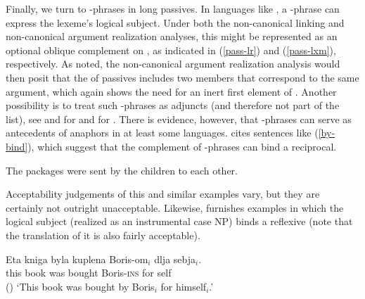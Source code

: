 \documentclass[output=paper
 	        ,biblatex
                ,babelshorthands
                ,newtxmath
                ,draftmode
                ,colorlinks, citecolor=brown
]{langscibook}
\begin{document}

Finally, we turn to -phrases in long passives.
In languages like , a -phrase can express the lexeme's logical subject.
Under both the non-canonical linking and non-canonical argument realization analyses, this might be represented as an optional oblique complement on \argst, as indicated in (\ref{pass-lr}) and (\ref{pass-lxm}), respectively.
As noted, the non-canonical argument realization analysis would then posit that the \argst of passives includes two members that correspond to the same argument, which again shows the need for an inert first element of \argst.
Another possibility is to treat such -phrases as adjuncts (and therefore not part of the \argst list), see \citet[Chapter 7]{Hoehle78a} and \citet[292--294]{Mueller2003e} for  and \citet[180]{Jackendoff1990} for . 
There is evidence, however, that -phrases can serve as antecedents of anaphors in at least some languages.
\citet[111]{Collins2005} cites sentences like (\ref{by-bind}), which suggest that the complement of -phrases can bind a reciprocal.

\begin{exe}
\ex\label{by-bind}The packages were sent by the children to each other.
\end{exe} 

\noindent
Acceptability judgements of this and similar examples vary, but they are certainly not outright unacceptable.  Likewise, \citet[10]{Perlmutter1984} furnishes  examples in which the logical subject (realized as an instrumental case NP) binds a reflexive (note that the  translation of it is also fairly acceptable).

\begin{exe}
\ex     \label{arg-st:russian-pass}
\gll Eta kniga byla kuplena Boris-om$_{i}$ dlja sebja$_{i}$.  \\
     this book was bought Boris-\textsc{ins} for self  \\\hfill()
\glt `This book was bought by Boris$_{i}$ for himself$_{i}$.'
\end{exe}
\end{document}
